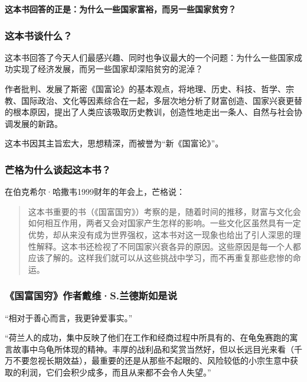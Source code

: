 \cleardoublepage
{}


\begin{BookSummaryBox}
\textbf{这本书回答的正是：为什么一些国家富裕，而另一些国家贫穷？}
\par
\end{BookSummaryBox}

\subsubsection*{这本书谈什么？}

这本书回答了今天人们最感兴趣、同时也争议最大的一个问题：为什么一些国家成功实现了经济发展，而另一些国家却深陷贫穷的泥淖？
\par

作者批判、发展了斯密《国富论》的基本观点，将地理、历史、科技、哲学、宗教、国际政治、文化等因素综合在一起，多层次地分析了财富创造、国家兴衰更替的根本原因，提出了人类应该吸取历史教训，创造性地走出一条人、自然与社会协调发展的新路。
\par

这本书因其主旨宏大，思想精深，而被誉为“新《国富论》”。
\par

\subsubsection*{芒格为什么谈起这本书？}

在伯克希尔·哈撒韦1999财年的年会上，芒格说：
\par

\begin{quotation}
这本书重要的书（《国富国穷》）考察的是，随着时间的推移，财富与文化会如何相互作用，两者又会对国家产生怎样的影响。一些文化区虽然具有一定优势，却从来没有成为世界强权，这本书对这一现象也给出了引人深思的理性解释。这本书还检视了不同国家兴衰各异的原因。这些原因是每一个人都应该了解的。这样我们就可以从这些挑战中学习，而不再重复那些悲惨的命运。
\par
\end{quotation}

\subsubsection*{《国富国穷》作者戴维·S.兰德斯如是说}

“相对于善心而言，我更钟爱事实。”
\par

“荷兰人的成功，集中反映了他们在工作和经商过程中所具有的、在龟兔赛跑的寓言故事中乌龟所体现的精神。丰厚的战利品和奖赏当然好，但以长远目光来看（千万不要忽视长期效益），最重要的还是从那些不起眼的、风险较低的小宗生意中获取的利润，它们会积少成多，而且从来都不会令人失望。”
\par
